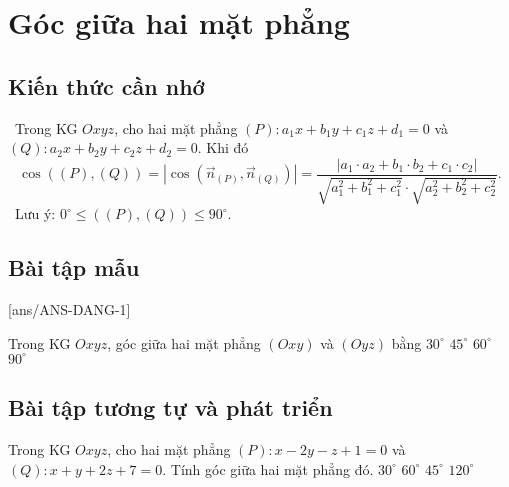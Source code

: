\setcounter{ex}{0}
\section{Góc giữa hai mặt phẳng}
\subsection{Kiến thức cần nhớ}
\begin{khung}
		\faCheckSquareO \, Trong KG $Oxyz$, cho hai mặt phẳng $(P)\colon a_{1}x+b_{1}y+c_{1}z+d_{1}=0$ và \linebreak $(Q)\colon a_{2}x+b_{2}y+c_{2}z+d_{2}=0$. Khi đó
		\[\cos\left((P), (Q)\right)=\left|\cos\left(\overrightarrow{n}_{(P)}, \overrightarrow{n}_{(Q)}\right)\right|=\dfrac{\left|a_{1}\cdot a_{2}+b_{1}\cdot b_{2}+c_{1}\cdot c_{2}\right|}{\sqrt{a_{1}^{2}+b_{1}^{2}+c_{1}^{2}}\cdot\sqrt{a_{2}^{2}+b_{2}^{2}+c_{2}^{2}}}.\]
		\faCheckSquareO \, Lưu ý: $0^\circ\le \left((P), (Q)\right)\le 90^\circ$.
\end{khung}

\subsection{Bài tập mẫu}
\setcounter{vd}{10}
[ans/ANS-DANG-1]
\begin{khung}
	\begin{vd}%
		Trong KG $Oxyz$, góc giữa hai mặt phẳng $(Oxy)$ và $(Oyz)$ bằng
		\choice
		{$30^{\circ}$}
		{$45^{\circ}$}
		{$60^{\circ}$}
		{\True $90^{\circ}$}
	\end{vd}
\end{khung}

\subsection{Bài tập tương tự và phát triển}
\begin{ex}%
	Trong KG $Oxyz$, cho hai mặt phẳng $(P)\colon x-2y-z+1=0$ và \linebreak $(Q)\colon x+y+2z+7=0$. Tính góc giữa hai mặt phẳng đó.
	\choice
	{$30^{\circ}$}
	{\True $60^{\circ}$}
	{$45^{\circ}$}
	{$120^{\circ}$}
\end{ex}

